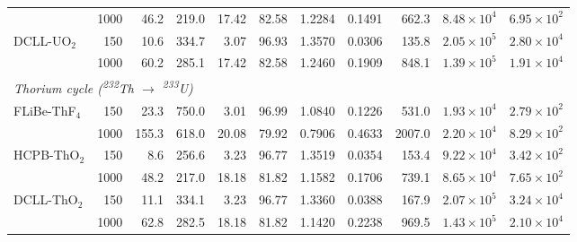 \begin{table}[htbp]
\begin{tabular}{@{} l r rr rr r rr cc @{}}
  & 1000 &  46.2   & 219.0 & 17.42  &  82.58 & 1.2284 & 0.1491 &  662.3 & $8.48{\times}10^4$ & $6.95{\times}10^2$ \\[2pt]
DCLL-UO$_2$
  &  150 &  10.6   & 334.7 &  3.07  &  96.93 & 1.3570 & 0.0306 &  135.8 & $2.05{\times}10^5$ & $2.80{\times}10^4$ \\
  & 1000 &  60.2   & 285.1 & 17.42  &  82.58 & 1.2460 & 0.1909 &  848.1 & $1.39{\times}10^5$ & $1.91{\times}10^4$ \\
\midrule
\multicolumn{11}{l}{\textit{Thorium cycle (\textsuperscript{232}Th $\to$ \textsuperscript{233}U)}} \\[2pt]
FLiBe-ThF$_4$
  &  150 &  23.3   & 750.0 &  3.01  &  96.99 & 1.0840 & 0.1226 &  531.0 & $1.93{\times}10^4$ & $2.79{\times}10^2$ \\
  & 1000 & 155.3   & 618.0 & 20.08  &  79.92 & 0.7906 & 0.4633 & 2007.0 & $2.20{\times}10^4$ & $8.29{\times}10^2$ \\[2pt]
HCPB-ThO$_2$
  &  150 &   8.6   & 256.6 &  3.23  &  96.77 & 1.3519 & 0.0354 &  153.4 & $9.22{\times}10^4$ & $3.42{\times}10^2$ \\
  & 1000 &  48.2   & 217.0 & 18.18  &  81.82 & 1.1582 & 0.1706 &  739.1 & $8.65{\times}10^4$ & $7.65{\times}10^2$ \\[2pt]
DCLL-ThO$_2$
  &  150 &  11.1   & 334.1 &  3.23  &  96.77 & 1.3360 & 0.0388 &  167.9 & $2.07{\times}10^5$ & $3.24{\times}10^4$ \\
  & 1000 &  62.8   & 282.5 & 18.18  &  81.82 & 1.1420 & 0.2238 &  969.5 & $1.43{\times}10^5$ & $2.10{\times}10^4$ \\
\bottomrule
\end{tabular}
\end{table}
